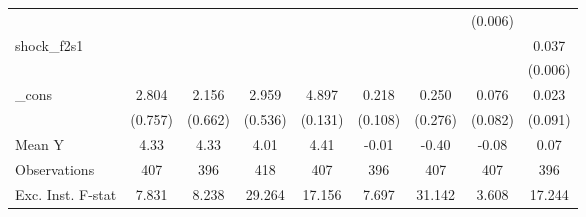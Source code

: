 {\begin{tabular}{l*{8}{c}}
            &                     &                     &                     &                     &                     &                     &     (0.006)         &                     \\
\addlinespace
shock\_f2s1  &                     &                     &                     &                     &                     &                     &                     &       0.037\sym{***}\\
            &                     &                     &                     &                     &                     &                     &                     &     (0.006)         \\
\addlinespace
\_cons      &       2.804\sym{***}&       2.156\sym{***}&       2.959\sym{***}&       4.897\sym{***}&       0.218\sym{*}  &       0.250         &       0.076         &       0.023         \\
            &     (0.757)         &     (0.662)         &     (0.536)         &     (0.131)         &     (0.108)         &     (0.276)         &     (0.082)         &     (0.091)         \\
\midrule
Mean Y      &        4.33         &        4.33         &        4.01         &        4.41         &       -0.01         &       -0.40         &       -0.08         &        0.07         \\
Observations&         407         &         396         &         418         &         407         &         396         &         407         &         407         &         396         \\
Exc. Inst. F-stat&       7.831         &       8.238         &      29.264         &      17.156         &       7.697         &      31.142         &       3.608         &      17.244         \\
\bottomrule
\end{tabular}
}

